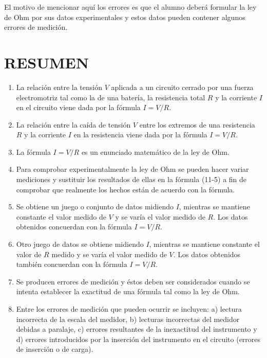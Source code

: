 \documentclass[12pt]{article}
\begin{document}
El motivo de mencionar aquí los errores es que el alumno deberá formular la ley de Ohm por sus datos experimentales y estos datos pueden contener algunos errores de medición.

\section{RESUMEN}
\begin{enumerate}
    \item La relación entre la tensión \( V \) aplicada a un circuito cerrado por una fuerza electromotriz tal como la de una batería, la resistencia total \( R \) y la corriente \( I \) en el circuito viene dada por la fórmula \( I = V/R \).
    \item La relación entre la caída de tensión \( V \) entre los extremos de una resistencia \( R \) y la corriente \( I \) en la resistencia viene dada por la fórmula \( I = V/R \).
    \item La fórmula \( I = V/R \) es un enunciado matemático de la ley de Ohm.
    \item Para comprobar experimentalmente la ley de Ohm se pueden hacer variar mediciones y sustituir los resultados de ellas en la fórmula (11-5) a fin de comprobar que realmente los hechos están de acuerdo con la fórmula.
    \item Se obtiene un juego o conjunto de datos midiendo \( I \), mientras se mantiene constante el valor medido de \( V \) y se varía el valor medido de \( R \). Los datos obtenidos concuerdan con la fórmula \( I = V/R \).
    \item Otro juego de datos se obtiene midiendo \( I \), mientras se mantiene constante el valor de \( R \) medido y se varía el valor medido de \( V \). Los datos obtenidos también concuerdan con la fórmula \( I = V/R \).
    \item Se producen errores de medición y éstos deben ser considerados cuando se intenta establecer la exactitud de una fórmula tal como la ley de Ohm.
    \item Entre los errores de medición que pueden ocurrir se incluyen: a) lectura incorrecta de la escala del medidor, b) lecturas incorrectas del medidor debidas a paralaje, c) errores resultantes de la inexactitud del instrumento y d) errores introducidos por la inserción del instrumento en el circuito (errores de inserción o de carga).
\end{enumerate}
\end{document}
